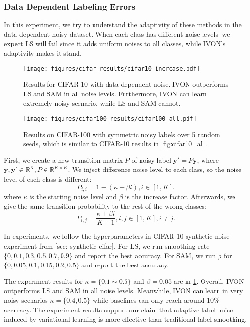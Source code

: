 \subsubsection{Data Dependent Labeling Errors} \label{sec: data dependent noise}
In this experiment, we try to understand the adaptivity of these methods in the data-dependent noisy dataset. When each class has different noise levels, we expect LS will fail since it adds uniform noises to all classes, while IVON's adaptivity makes it stand.


\begin{figure}[t]
    \centering
    \texttt{[image: figures/cifar\_results/cifar10\_increase.pdf]}
    \caption{Results for CIFAR-10 with data dependent noise. IVON outperforms LS and SAM in all noise levels. Furthermore, IVON can learn extremely noisy scenario, while LS and SAM cannot.}
    \label{fig:cifar10_inc_acc}
\end{figure}

\begin{figure*}[t!]
	\centering
	\texttt{[image: figures/cifar100\_results/cifar100\_all.pdf]}
	\caption{Results on CIFAR-100 with symmetric noisy labels over 5 random seeds, which is similar to CIFAR-10 results in \cref{fig:cifar10_all}.}
	\label{fig:cifar100_all}
\end{figure*}

First, we create a new transition matrix $P$ of noisy label $\mathbf{y}'=P\mathbf{y}$, where $\mathbf{y, y'} \in \mathbb{R}^K, P \in \mathbb{R}^{K\times K}$. We inject difference noise level to each class, so the noise level of each class is different:
\begin{equation} \label{equ: diagonal noise}
    P_{i,i}=1-(\kappa+\beta i), i \in [1,K].
\end{equation}
where $\kappa$ is the starting noise level and $\beta$ is the increase factor. Afterwards, we give the same transition probability to the rest of the wrong classes:
\begin{equation}
    P_{i,j}=\frac{\kappa+\beta i}{K-1}, i,j \in [1,K], i\neq j.
\end{equation}

In experiments, we follow the hyperparameters in CIFAR-10 synthetic noise experiment from \cref{sec: synthetic cifar}. For LS, we run smoothing rate $\{0,0.1,0.3,0.5,0.7,0.9\}$ and report the best accuracy. For SAM, we run $\rho$ for $\{0,0.05,0.1,0.15,0.2,0.5\}$ and report the best accuracy.


The experiment results for $\kappa= \{0.1 \sim 0.5\}$ and $\beta=0.05$ are in \cref{fig:cifar10_inc_acc}. Overall, IVON outperforms LS and SAM in all noise levels. Meanwhile, IVON can learn in very noisy scenarios $\kappa=\{0.4, 0.5\}$ while baselines can only reach around $10\%$ accuracy. The experiment results support our claim that adaptive label noise induced by variational learning is more effective than traditional label smoothing.


